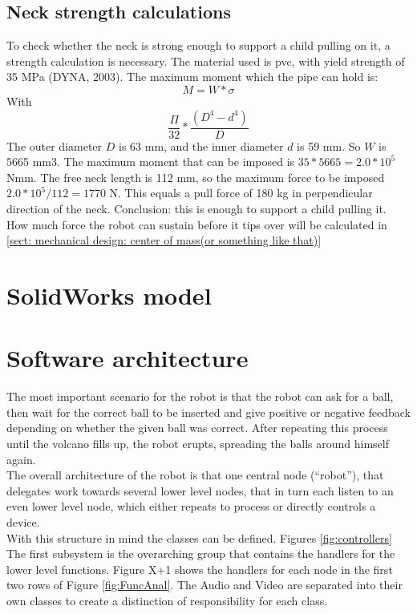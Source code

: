 \documentclass[11pt,twoside,a4paper]{report}
\begin{document}
\subsection{Neck strength calculations}
To check whether the neck is strong enough to support a child pulling on it, a strength calculation is necessary. The material used is pvc, with yield strength of 35 MPa (DYNA, 2003).
The maximum moment which the pipe can hold is:
\[M=W*\sigma\]
With
\[\frac{\Pi}{32}*\frac{(D^{4}-d^{4})}{D}\]
The outer diameter $D$ is 63 mm, and the inner diameter $d$ is 59 mm. So $W$ is 5665 mm3. The maximum moment that can be imposed is $35*5665= 2.0*10^5$ Nmm. 
The free neck length is 112 mm, so the maximum force to be imposed $2.0*10^5/112 = 1770$ N. This equals a pull force of 180 kg in perpendicular direction of the neck. Conclusion: this is enough to support a child pulling it. How much force the robot can sustain before it tips over will be calculated in  \ref{sect: mechanical design: center of mass(or something like that)} 


\section{SolidWorks model}
\section{Software architecture}
The most important scenario for the robot is that the robot can ask for a ball, then wait for the correct ball to be inserted and give positive or negative feedback depending on whether the given ball was correct. After repeating this process until the volcano fills up, the robot erupts, spreading the balls around himself again. \\
The overall architecture of the robot is that one central node (“robot”), that delegates work towards several lower level nodes, that in turn each listen to an even lower level node, which either repeats to process or directly controls a device. \\
With this structure in mind the classes can be defined. Figures \ref{fig:controllers} The first subsystem is the overarching group that contains the handlers for the lower level functions. Figure X+1 shows the handlers for each node in the first two rows of Figure \ref{fig:FuncAnal}. The Audio and Video are separated into their own classes to create a distinction of responsibility for each class. 
\end{document}
